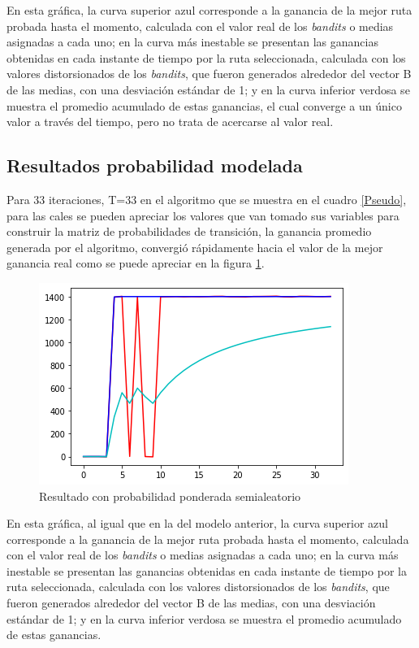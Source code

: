 En esta gráfica, la curva superior azul corresponde a la ganancia de la mejor ruta probada hasta el momento, calculada con el valor real de los \textit{bandits} o medias asignadas a cada uno; en la curva más inestable se presentan las ganancias obtenidas en cada instante de tiempo por la ruta seleccionada, calculada con los valores distorsionados de los \textit{bandits}, que fueron generados alrededor del vector B de las medias, con una desviación estándar de 1; y en la curva inferior verdosa se muestra el promedio acumulado de estas ganancias, el cual converge a un único valor a través del tiempo, pero no trata de acercarse al valor real.

\subsection{Resultados probabilidad modelada}

Para 33 iteraciones, T=33 en el algoritmo que se muestra en el cuadro \ref{Pseudo}, para las cales se pueden apreciar los valores que van tomado sus variables para construir la matriz de probabilidades de transición, la ganancia promedio generada por el algoritmo, convergió rápidamente hacia el valor de la mejor ganancia real como se puede apreciar en la figura \ref{Resul2}. 

\begin{figure} [H]
	\centering
	\includegraphics[scale=1]{Resul2}
	\caption{Resultado con probabilidad ponderada semialeatorio}
	\label{Resul2}
\end{figure}

En esta gráfica, al igual que en la del modelo anterior, la curva superior azul corresponde a la ganancia de la mejor ruta probada hasta el momento, calculada con el valor real de los \textit{bandits} o medias asignadas a cada uno; en la curva más inestable se presentan las ganancias obtenidas en cada instante de tiempo por la ruta seleccionada, calculada con los valores distorsionados de los \textit{bandits}, que fueron generados alrededor del vector B de las medias, con una desviación estándar de 1; y en la curva inferior verdosa se muestra el promedio acumulado de estas ganancias.

